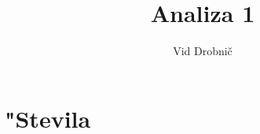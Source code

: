 \documentclass[a4paper, 12pt]{article}
\title{Analiza 1}
\author{Vid Drobnič}
\date{}
\begin{document}
	\maketitle
	\thispagestyle{empty}
	\pagebreak
	\setcounter{page}{1}
	
	\tableofcontents
	\pagebreak
	
	\section{"Stevila}
	
\end{document}
